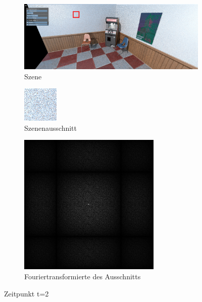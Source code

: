 \begin{figure}[H]
    \begin{subfigure}{\textwidth}
        \centering \includegraphics[scale=.2]{content/TemporalerAlg/Bilder/Screenshotreihe/frame_t_3.0.png}
        \caption{Szene}
        \label{fig:Szene_t2}
    \end{subfigure}
    \begin{subfigure}{0.5\textwidth}
        \centering\includegraphics[width=0.5\linewidth]{content/TemporalerAlg/Bilder/Screenshotreihe/frame_t_3.0_64x64.png} 
        \caption{Szenenausschnitt}
        \label{fig:ausschnitt_t2}
    \end{subfigure}
    \begin{subfigure}{0.5\textwidth}
        \centering\includegraphics[width=0.5\linewidth]{content/TemporalerAlg/Bilder/Screenshotreihe/spektrum/frame_t_3.0_64x64_fourier.png}
        \caption{Fouriertransformierte des Ausschnitts}
        \label{fig:Fouriertransformierte_t2}
    \end{subfigure}
        \caption{Zeitpunkt t=2}
        \label{fig:Verlauf_t2}
\end{figure}

